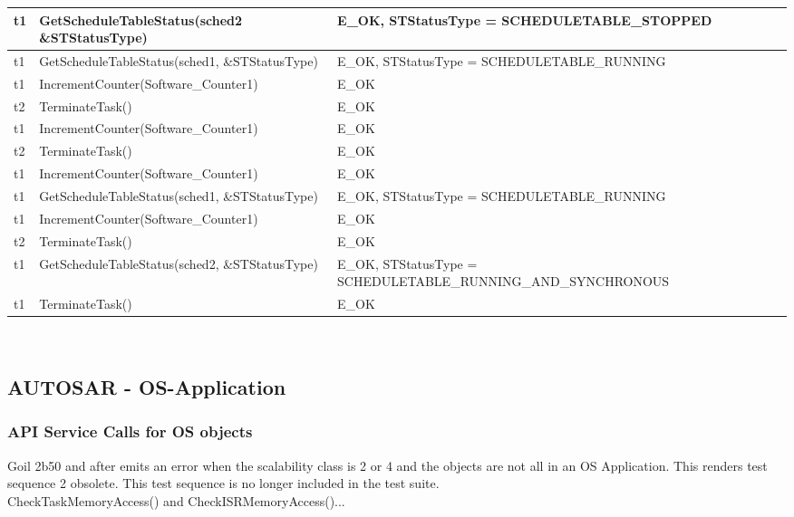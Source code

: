 \documentclass[10pt]{article}
\newlength{\Li}\settowidth{\Li}{Running}
\newlength{\Lii}\setlength{\Lii}{7cm}
\newlength{\Liiii}\setlength{\Liiii}{0.9cm}
\newlength{\Liii}\setlength{\Liii}{\textwidth} \addtolength{\Liii}{-\Li} \addtolength{\Liii}{-\Lii} \addtolength{\Liii}{-\Liiii}
\begin{document}
\begin{supertabular}{|p{\Li}|p{\Lii}|p{\Liii}|p{\Liiii}|}
	t1		& GetScheduleTableStatus(sched2 \&STStatusType)						& E\_OK, STStatusType = SCHEDULETABLE\_STOPPED							& \\ \hline
	t1		& GetScheduleTableStatus(sched1, \&STStatusType)						& E\_OK, STStatusType = SCHEDULETABLE\_RUNNING							& \\ \hline
	t1		& IncrementCounter(Software\_Counter1)								& E\_OK																	& \\ \hline
	t2		& TerminateTask()													& E\_OK																	& \\ \hline
	t1		& IncrementCounter(Software\_Counter1)								& E\_OK																	& \\ \hline
	t2		& TerminateTask()													& E\_OK																	& \\ \hline
	t1		& IncrementCounter(Software\_Counter1)								& E\_OK																	& \\ \hline
	t1		& GetScheduleTableStatus(sched1, \&STStatusType)						& E\_OK, STStatusType = SCHEDULETABLE\_RUNNING							& \\ \hline
	t1		& IncrementCounter(Software\_Counter1)								& E\_OK																	& \\ \hline
	t2		& TerminateTask()													& E\_OK																	& \\ \hline
	t1		& GetScheduleTableStatus(sched2, \&STStatusType)						& E\_OK, STStatusType = SCHEDULETABLE\_RUNNING\_\-AND\_SYNCHRONOUS		& \\ \hline
	t1		& TerminateTask()													& E\_OK																	& \\ \hline
	\end{supertabular}\\

\subsection{AUTOSAR - OS-Application}
	
	\subsubsection{API Service Calls for OS objects}
	Goil 2b50 and after emits an error when the scalability class is 2 or 4 and the objects are not all in an OS Application. This renders test sequence 2 obsolete. This test sequence is no longer included in the test suite.\\	
	CheckTaskMemoryAccess() and CheckISRMemoryAccess()... \\ 
	
\end{document}
